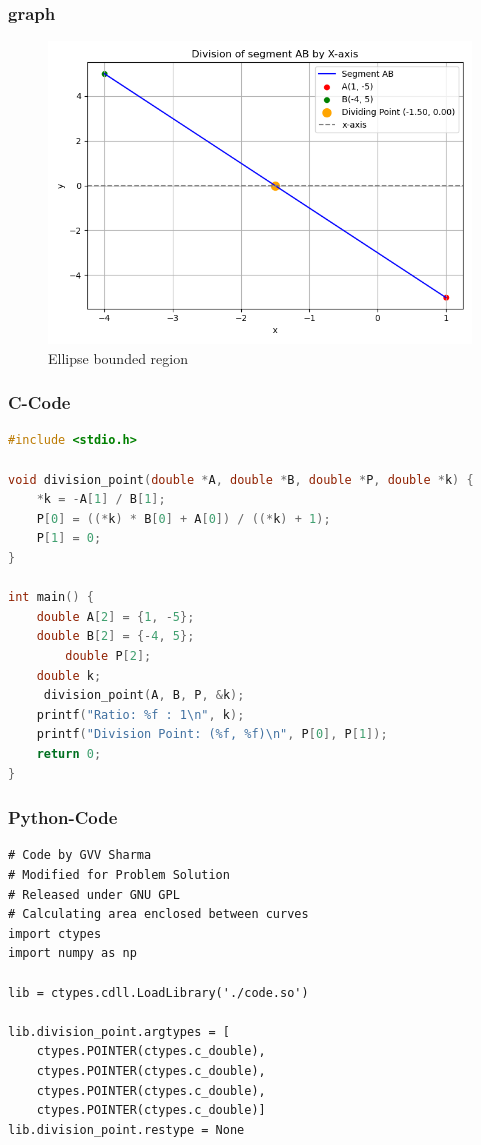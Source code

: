 \documentclass{beamer}
\begin{document}
\begin{frame}
\frametitle{graph}
\begin{figure}[!ht]
    \centering
    \includegraphics[width=\linewidth]{figs/points.png}
    \caption{Ellipse bounded region}
\end{figure}
\end{frame}

\begin{frame}[fragile]
\frametitle{C-Code}
\begin{lstlisting}[language=C]
#include <stdio.h>

void division_point(double *A, double *B, double *P, double *k) {
    *k = -A[1] / B[1];
    P[0] = ((*k) * B[0] + A[0]) / ((*k) + 1);
    P[1] = 0;
}

int main() {
    double A[2] = {1, -5};
    double B[2] = {-4, 5};
        double P[2];
    double k;
     division_point(A, B, P, &k);
    printf("Ratio: %f : 1\n", k);
    printf("Division Point: (%f, %f)\n", P[0], P[1]);
    return 0;
}
 \end{lstlisting}
\end{frame}

\begin{frame}[fragile]
\frametitle{Python-Code}
\begin{lstlisting}
# Code by GVV Sharma
# Modified for Problem Solution
# Released under GNU GPL
# Calculating area enclosed between curves
import ctypes
import numpy as np

lib = ctypes.cdll.LoadLibrary('./code.so')

lib.division_point.argtypes = [
    ctypes.POINTER(ctypes.c_double),
    ctypes.POINTER(ctypes.c_double),
    ctypes.POINTER(ctypes.c_double),
    ctypes.POINTER(ctypes.c_double)]
lib.division_point.restype = None

\end{lstlisting}
\end{frame}
\end{document}
